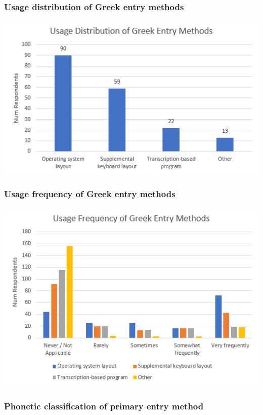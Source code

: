 \documentclass[11pt]{article}
\begin{document}
\subsubsection{Usage distribution of Greek entry methods}
\label{sec:orgf69b6d9}

\begin{center}
\includegraphics[width=.9\linewidth]{./images/entry-methods.PNG}
\end{center}

\subsubsection{Usage frequency of Greek entry methods}
\label{sec:orgaf6efcb}

\begin{center}
\includegraphics[width=.9\linewidth]{./images/entry-method-usage-distribution.PNG}
\end{center}

\subsubsection{Phonetic classification of primary entry method}
\label{sec:org3e69648}
\end{document}
